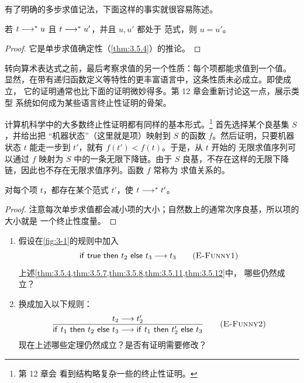 有了明确的多步求值记法，下面这样的事实就很容易陈述。

\begin{theorem}[范式的唯一性]
\label{thm:3.5.11}
若 \(t\mathrel{\longrightarrow^{*}} u\) 且 \(t\mathrel{\longrightarrow^{*}} u'\)，并且 \(u,u'\) 都处于
范式，则 \(u=u'\)。
\end{theorem}

\begin{proof}
它是单步求值确定性（\cref{thm:3.5.4}）的推论。
\end{proof}

转向算术表达式之前，最后考察求值的另一个性质：每个项都能求值到一个值。
显然，在带有递归函数定义等特性的更丰富语言中，这条性质未必成立。即使成立，
它的证明通常也比下面的证明微妙得多。第 12 章会重新讨论这一点，展示类型
系统如何成为某些语言终止性证明的骨架。

计算机科学中的大多数终止性证明都有同样的基本形式。\footnote{第 12 章会
看到结构略复杂一些的终止性证明。} 首先选择某个良基集 \(S\)，并给出把
“机器状态”（这里就是项）映射到 \(S\) 的函数 \(f\)。然后证明，只要机器
状态 \(t\) 能走一步到 \(t'\)，就有 \(f(t')<f(t)\)。于是，从 \(t\) 开始的
无限求值序列可以通过 \(f\) 映射为 \(S\) 中的一条无限下降链。由于 \(S\)
良基，不存在这样的无限下降链，因此也不存在无限求值序列。函数 \(f\) 常称为
求值关系的。

\begin{theorem}[求值的终止性]
\label{thm:3.5.12}
对每个项 \(t\)，都存在某个范式 \(t'\)，使 \(t\mathrel{\longrightarrow^{*}} t'\)。
\end{theorem}

\begin{proof}
注意每次单步求值都会减小项的大小；自然数上的通常次序良基，所以项的大小就是
一个终止性度量。
\end{proof}

\begin{exercise}
\label{ex:3.5.13}
\begin{enumerate}
  \item 假设在\cref{fig:3-1}的规则中加入
    \[
      \mathsf{if}\ \mathsf{true}\ \mathsf{then}\ t_2\ \mathsf{else}\ t_3\mathrel{\longrightarrow} t_3
      \qquad(\textsc{E-Funny1})
    \]
    上述\cref{thm:3.5.4,thm:3.5.7,thm:3.5.8,thm:3.5.11,thm:3.5.12}中，
    哪些仍然成立？

  \item 换成加入以下规则：
    \[
      \frac{t_2\mathrel{\longrightarrow} t_2'}
           {\mathsf{if}\ t_1\ \mathsf{then}\ t_2\ \mathsf{else}\ t_3\mathrel{\longrightarrow}\mathsf{if}\ t_1\ \mathsf{then}\ t_2'\ \mathsf{else}\ t_3}
      \qquad(\textsc{E-Funny2})
    \]
    现在上述哪些定理仍然成立？是否有证明需要修改？
\end{enumerate}
\end{exercise}

